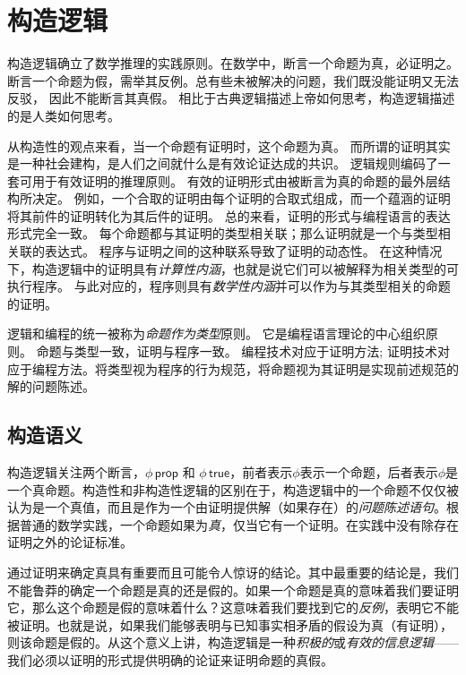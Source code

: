 \chapter{构造逻辑}

构造逻辑确立了数学推理的实践原则。在数学中，断言一个命题为真，必证明之。
断言一个命题为假，需举其反例。总有些未被解决的问题，我们既没能证明又无法反驳， 因此不能断言其真假。
相比于古典逻辑描述上帝如何思考，构造逻辑描述的是人类如何思考。


从构造性的观点来看，当一个命题有证明时，这个命题为真。 而所谓的证明其实是一种社会建构，是人们之间就什么是有效论证达成的共识。
逻辑规则编码了一套可用于有效证明的推理原则。 有效的证明形式由被断言为真的命题的最外层结构所决定。
例如，一个合取的证明由每个证明的合取式组成，而一个蕴涵的证明将其前件的证明转化为其后件的证明。 总的来看，证明的形式与编程语言的表达形式完全一致。
每个命题都与其证明的类型相关联；那么证明就是一个与类型相关联的表达式。 程序与证明之间的这种联系导致了证明的动态性。
在这种情况下，构造逻辑中的证明具有\textit{计算性内涵}，也就是说它们可以被解释为相关类型的可执行程序。
与此对应的，程序则具有\textit{数学性内涵}并可以作为与其类型相关的命题的证明。


逻辑和编程的统一被称为\textit{命题作为类型}原则。 它是编程语言理论的中心组织原则。 命题与类型一致，证明与程序一致。 编程技术对应于证明方法;  证明技术对应于编程方法。将类型视为程序的行为规范，将命题视为其证明是实现前述规范的解的问题陈述。
\section{构造语义}
构造逻辑关注两个断言，$\phi\,\mathsf{prop}$ 和 $\phi\,\mathsf{true}$，前者表示${\phi}$表示一个命题，后者表示${\phi}$是一个真命题。构造性和非构造性逻辑的区别在于，构造逻辑中的一个命题不仅仅被认为是一个真值，而且是作为一个由证明提供解（如果存在）的\textit{问题陈述语句}。根据普通的数学实践，一个命题如果为\textit{真}，仅当它有一个证明。在实践中没有除存在证明之外的论证标准。


通过证明来确定真具有重要而且可能令人惊讶的结论。其中最重要的结论是，我们不能鲁莽的确定一个命题是真的还是假的。如果一个命题是真的意味着我们要证明它，那么这个命题是假的意味着什么？这意味着我们要找到它的\textit{反例}，表明它不能被证明。也就是说，如果我们能够表明与已知事实相矛盾的假设为真（有证明），则该命题是假的。从这个意义上讲，构造逻辑是一种\textit{积极的}或\textit{有效的信息逻辑}——我们必须以证明的形式提供明确的论证来证明命题的真假。


